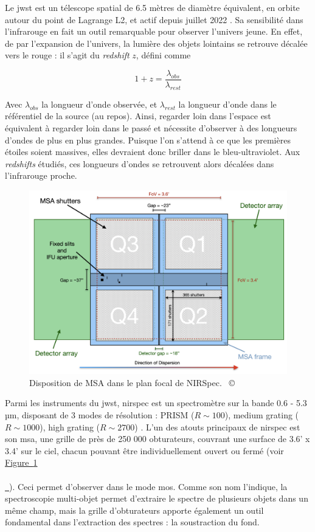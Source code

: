 \documentclass[12pt, a4paper]{article}
\newcommand{\customcite}[1]{\mbox{
  {\small \copyright} \cite{#1}}
}
\newcommand*{\figref}[2][]{%
  \hyperref[{#2}]{%
    Figure~\ref*{#2}%
    \ifx\\#1\\%
    \else
      \,#1%
    \fi
  }%
}
\begin{document}
Le \gls{jwst} est un télescope spatial de 6.5 mètres de diamètre équivalent, en orbite autour du point de Lagrange L2, et actif depuis juillet 2022 . Sa sensibilité dans l'infrarouge en fait un outil remarquable pour observer l'univers jeune. En effet, de par l'expansion de l'univers, la lumière des objets lointains se retrouve décalée vers le rouge : il s'agit du \textit{redshift} $z$, défini comme 

\begin{equation}
    1 + z = \frac{\lambda_{obs}}{\lambda_{rest}}
\end{equation}

Avec $\lambda_{obs}$ la longueur d'onde observée, et $\lambda_{rest}$ la longueur d'onde dans le référentiel de la source (au repos). Ainsi, regarder loin dans l'espace est équivalent à regarder loin dans le passé et nécessite d'observer à des longueurs d'ondes de plus en plus grandes. Puisque l'on s'attend à ce que les premières étoiles soient massives, elles devraient donc briller dans le bleu-ultraviolet. Aux \textit{redshifts} étudiés, ces longueurs d'ondes se retrouvent alors décalées dans l'infrarouge proche.

\begin{figure}[!h]
  \centering
  \includegraphics[scale=0.4]{assets/msa_ds_new.png}
  \caption{Disposition de MSA dans le plan focal de NIRSpec. \customcite{2022A&A...661A..81F}}
  \label{fig:msa_shutter}
\end{figure}

Parmi les instruments du \gls{jwst}, \gls{nirspec} est un spectromètre sur la bande 0.6 - 5.3  µm, disposant de 3 modes de résolution : PRISM ($R \sim 100$), medium grating ($R \sim 1000$), high grating ($R \sim 2700$) . L'un des atouts principaux de \gls{nirspec} est son \gls{msa}, une grille de près de 250 000 obturateurs, couvrant une surface de 3.6' x 3.4' sur le ciel, chacun pouvant être individuellement ouvert ou fermé  (voir \figref{fig:msa_shutter}). Ceci permet d'observer dans le mode \gls{mos}. Comme son nom l'indique, la spectroscopie multi-objet permet d'extraire le spectre de plusieurs objets dans un même champ, mais la grille d'obturateurs apporte également un outil fondamental dans l'extraction des spectres : la soustraction du fond.\\
\end{document}
